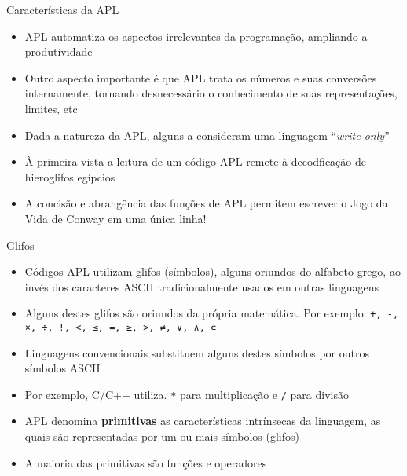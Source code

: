 \begin{frame}[fragile]{Características da APL}

    \begin{itemize}
        \item APL automatiza os aspectos irrelevantes da programação, ampliando a produtividade
        \pause

        \item Outro aspecto importante é que APL trata os números e suas conversões internamente, tornando desnecessário o conhecimento de suas representações, limites, etc
        \pause

        \item Dada a natureza da APL, alguns a consideram uma linguagem ``\textit{write-only}''
        \pause

        \item À primeira vista a leitura de um código APL remete à decodficação de hieroglifos egípcios
        \pause

        \item A concisão e abrangência das funções de APL permitem escrever o Jogo da Vida de Conway em uma única linha!
        \pause

    \end{itemize}

\end{frame}

\begin{frame}[fragile]{Glifos}

    \begin{itemize}
        \item Códigos APL utilizam glifos (símbolos), alguns oriundos do alfabeto grego, ao invés dos caracteres ASCII tradicionalmente usados em outras linguagens
        \pause

        \item Alguns destes glifos são oriundos da própria matemática. Por exemplo: \texttt{+, -, ×, ÷, !, <, ≤, =, ≥, >, ≠, ∨, ∧, ∊}
        \pause

        \item Linguagens convencionais substituem alguns destes símbolos por outros símbolos ASCII
        \pause


        \item Por exemplo, C/C++ utiliza. \texttt{*} para multiplicação e  \texttt{/} para divisão
        \pause

        \item APL denomina \textbf{primitivas} as características intrínsecas da linguagem, as quais são representadas por um ou mais símbolos (glifos)
        \pause

        \item A maioria das primitivas são funções e operadores
    \end{itemize}

\end{frame}


